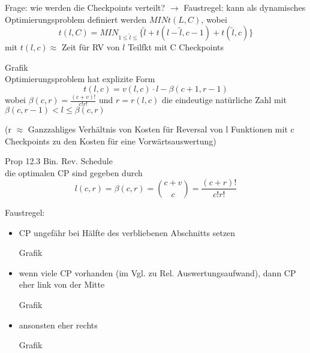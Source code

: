 Frage: wie werden die Checkpoints verteilt?
$\rightarrow$ Faustregel: kann als dynamisches Optimierungsproblem definiert werden \glqq$MIN t(L,C)$\grqq, wobei 
$$t(l,C) = MIN_{1\leq \tilde{l}\leq} \{\tilde{l} + t( l- \tilde{l},c-1)+t(\tilde{l},c)\}$$
mit
$ t(l,c) \approx$ Zeit für RV von $l$ Teilfkt mit C Checkpoints\\

\vspace{1cm}

Grafik\\

\noindent
Optimierungsproblem hat explizite Form 
$$t(l,c) = v(l,c) \cdot l - \beta (c+1, r-1)$$
wobei $\beta(c,r) = \frac{(c+v)!}{c!r!}$ und $r = r(l,c)$
die eindeutige natürliche Zahl mit $\beta (c,r-1) < l \leq \beta (c,r)$

(r $\approx$ Ganzzahliges Verhältnis von Kosten für Reversal von l Funktionen mit c Checkpoints zu den Kosten für eine Vorwärtsauswertung)

Prop 12.3 \glqq Bin. Rev. Schedule \grqq\\
die optimalen CP sind gegeben durch 
$$ l(c,r) = \beta(c,r) = \binom{c+v}{c} = \frac{(c+r)!}{c!r!}$$

Faustregel:
\begin{itemize}
	
	\item CP ungefähr bei Hälfte des verbliebenen Abschnitts setzen
	
	Grafik
	\item wenn viele CP vorhanden (im Vgl. zu Rel. Auswertungsaufwand), dann CP eher link von der Mitte
	
	Grafik
	\item ansonsten eher rechts
	
	Grafik
\end{itemize}
